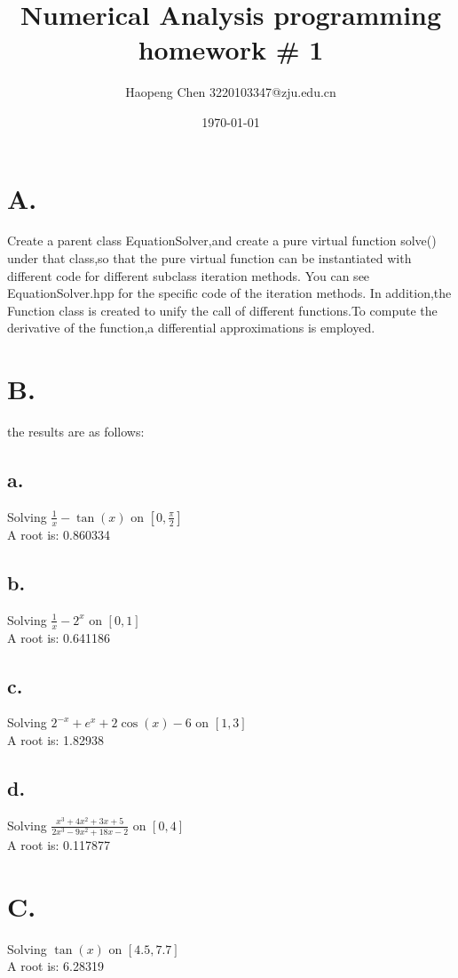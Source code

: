 \documentclass[a4paper]{article}
\begin{document}
\title{Numerical Analysis programming homework \# 1}
\author{Haopeng Chen 3220103347@zju.edu.cn}
\date{\today}
\maketitle
\section*{A.}
Create a parent class EquationSolver,and create a pure virtual function solve() under that class,so that the pure virtual function can be instantiated with different code for different subclass iteration methods. You can see EquationSolver.hpp for the specific code of the iteration methods.
In addition,the Function class is created to unify the call of different functions.To compute the derivative of the function,a differential approximations is employed.

\section*{B.}
the results are as follows:
\subsection*{a.}
Solving $\frac{1}{x}-\tan(x)$ on $[0,\frac{\pi}{2}]$\\
A root is: 0.860334
\subsection*{b.}
Solving $\frac{1}{x}-2^{x}$ on $[0,1]$\\
A root is: 0.641186
\subsection*{c.}
Solving $2^{-x}+e^{x}+2\cos(x)-6$ on $[1,3]$\\
A root is: 1.82938
\subsection*{d.}
Solving $\frac{x^{3}+4x^{2}+3x+5}{2x^{3}-9x^{2}+18x-2}$ on $[0,4]$\\
A root is: 0.117877

\section*{C.}
Solving $\tan(x)$ on $[4.5,7.7]$\\
A root is: 6.28319
\end{document}

